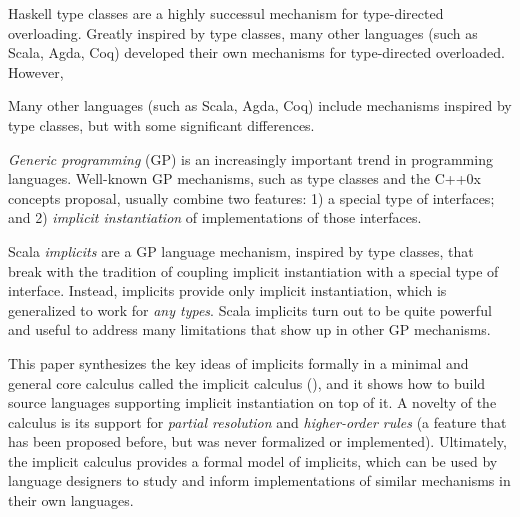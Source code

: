 Haskell type classes are a highly successul mechanism for
type-directed overloading. Greatly inspired by type classes, 
many other languages (such as Scala, Agda,
Coq) developed their own mechanisms 
for type-directed overloaded. However, 

Many other languages (such as Scala, Agda,
Coq) include mechanisms inspired by type classes, but
with some significant differences.

\emph{Generic programming} (GP) is an increasingly important trend in
programming languages. Well-known GP mechanisms, such as type classes
and the C++0x concepts proposal, usually combine two features: 1) a special type of
interfaces; and 2) \emph{implicit instantiation} of implementations of
those interfaces.

Scala \emph{implicits} are a GP language mechanism, inspired by type
classes, that break with the tradition of coupling
implicit instantiation with a special type of interface. Instead,
implicits provide only implicit instantiation, which is generalized to
work for \emph{any types}. 
Scala implicits turn out to be quite
powerful and useful to address many limitations that show up in other
GP mechanisms.

This paper synthesizes the key ideas of implicits formally in a minimal
and general core calculus called the implicit calculus (\name),
and it shows how to build source languages supporting implicit
instantiation on top of it. A novelty of the calculus is its support
for \emph{partial resolution} and \emph{higher-order rules} (a feature 
that has been proposed before, but was never formalized or implemented).
Ultimately, the implicit calculus provides a formal model of implicits, 
which can be used by language designers to 
study and inform implementations of similar mechanisms in their own languages.





